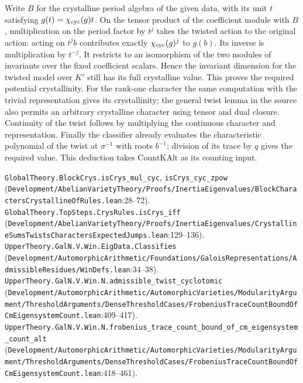 Write $B$ for the crystalline period algebra of the given data, with its unit $t$ satisfying $g(t)=\chi_{\rm cyc}(g)t$. On the tensor product of the coefficient module with $B$, multiplication on the period factor by $t^j$ takes the twisted action to the original action: acting on $t^j b$ contributes exactly $\chi_{\rm cyc}(g)^j$ to $g(b)$. Its inverse is multiplication by $t^{-j}$. It restricts to an isomorphism of the two modules of invariants over the fixed coefficient scalars. Hence the invariant dimension for the twisted model over $K'$ still has its full crystalline value. This proves the required potential crystallinity. For the rank-one character the same computation with the trivial representation gives its crystallinity; the general twist lemma in the source also permits an arbitrary crystalline character using tensor and dual closure. Continuity of the twist follows by multiplying the continuous character and representation. Finally the classifier already evaluates the characteristic polynomial of the twist at $\sigma^{-1}$ with roots $b^{-1}$; division of its trace by $q$ gives the required value. This deduction takes $\mathrm{CountKAlt}$ as its counting input.
\par{\footnotesize \nolinkurl{GlobalTheory.BlockCrys.isCrys_mul_cyc}, \nolinkurl{isCrys_cyc_zpow} (\nolinkurl{Development/AbelianVarietyTheory/Proofs/InertiaEigenvalues/BlockCharactersCrystallineOfRules.lean}\allowbreak:28--72). \nolinkurl{GlobalTheory.TopSteps.CrysRules.isCrys_iff} (\nolinkurl{Development/AbelianVarietyTheory/Proofs/InertiaEigenvalues/CrystallineSumsTwistsCharactersExpectedJumps.lean}\allowbreak:129--136). \nolinkurl{UpperTheory.GalN.V.Win.EigData.Classifies} (\nolinkurl{Development/AutomorphicArithmetic/Foundations/GaloisRepresentations/AdmissibleResidues/WinDefs.lean}\allowbreak:34--38). \nolinkurl{UpperTheory.GalN.V.Win.N.admissible_twist_cyclotomic} (\nolinkurl{Development/AutomorphicArithmetic/AutomorphicVarieties/ModularityArgument/ThresholdArguments/DenseThresholdCases/FrobeniusTraceCountBoundOfCmEigensystemCount.lean}\allowbreak:409--417). \nolinkurl{UpperTheory.GalN.V.Win.N.frobenius_trace_count_bound_of_cm_eigensystem_count_alt} (\nolinkurl{Development/AutomorphicArithmetic/AutomorphicVarieties/ModularityArgument/ThresholdArguments/DenseThresholdCases/FrobeniusTraceCountBoundOfCmEigensystemCount.lean}\allowbreak:418--461).\par}

